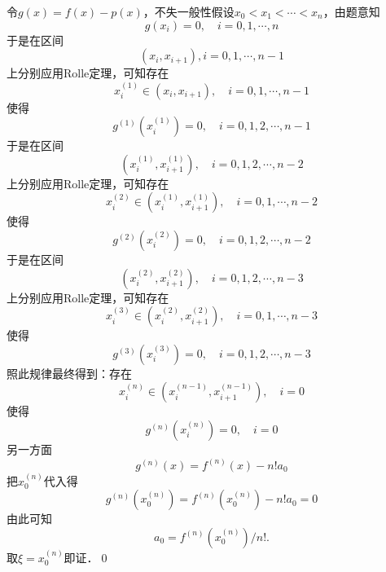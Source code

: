 \prove 令$g(x)=f(x)-p(x)$，不失一般性假设$x_0<x_1<\cdots<x_n$，由题意知
\begin{equation}
    g(x_i)=0,\quad i = 0,1,\cdots,n
\end{equation}
于是在区间
\begin{equation}
(x_i,x_{i+1}),i=0,1,\cdots,n-1
\end{equation}
上分别应用Rolle定理，可知存在
\begin{equation}
x^{(1)}_i \in (x_{i},x_{i+1}), \quad i = 0,1,\cdots,n-1
\end{equation}
使得
\begin{equation}
g^{(1)}(x^{(1)}_i)=0, \quad i=0,1,2,\cdots,n-1
\end{equation}
于是在区间
\begin{equation}
(x^{(1)}_{i},x^{(1)}_{i+1}),\quad i=0,1,2,\cdots,n-2
\end{equation}
上分别应用Rolle定理，可知存在
\begin{equation}
x^{(2)}_{i}\in (x^{(1)}_{i},x^{(1)}_{i+1}), \quad i = 0,1,\cdots,n-2
\end{equation}
使得
\begin{equation}
g^{(2)}(x^{(2)}_i)=0, \quad i=0,1,2,\cdots,n-2
\end{equation}
于是在区间
\begin{equation}
    (x^{(2)}_{i},x^{(2)}_{i+1}),\quad i=0,1,2,\cdots,n-3
\end{equation}
上分别应用Rolle定理，可知存在
\begin{equation}
    x^{(3)}_{i}\in (x^{(2)}_{i},x^{(2)}_{i+1}), \quad i = 0,1,\cdots,n-3
\end{equation}
使得
\begin{equation}
g^{(3)}(x^{(3)}_i)=0, \quad i=0,1,2,\cdots,n-3
\end{equation}
照此规律最终得到：存在
\begin{equation}
    x^{(n)}_i \in (x^{(n-1)}_i, x^{(n-1)}_{i+1}), \quad i = 0
\end{equation}
使得
\begin{equation}
    g^{(n)}(x^{(n)}_i) = 0, \quad i = 0
\end{equation}
另一方面
\begin{equation}
    g^{(n)}(x) = f^{(n)}(x)-n!a_0
\end{equation}
把$x^{(n)}_{0}$代入得
\begin{equation}
    g^{(n)}(x^{(n)}_0) = f^{(n)}(x^{(n)}_0)-n!a_0 = 0
\end{equation}
由此可知
\begin{equation}
    a_0 = f^{(n)}(x^{(n)}_0)/n!.
\end{equation}
取$\xi = x^{(n)}_0$即证．\qed\bigskip